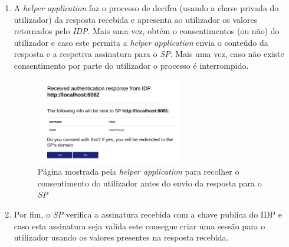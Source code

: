 \begin{enumerate}
    \item A \textit{helper application} faz o processo de decifra (usando a chave privada do utilizador) da resposta recebida e apresenta ao utilizador os valores retornados pelo \textit{IDP}. Mais uma vez, obtém o consentimentos (ou não) do utilizador e caso este permita a \textit{helper application} envia o conteúdo da resposta e a respetiva assinatura para o \textit{SP}. Mais uma vez, caso não existe consentimento por parte do utilizador o processo é interrompido.
    \begin{figure}[H]
        \caption{Página mostrada pela \textit{helper application} para recolher o consentimento do utilizador antes do envio da resposta para o \textit{SP}}
        \includegraphics[width=0.6\textwidth]{img/response_conset.png}
        \centering
    \end{figure}
    \item Por fim, o \textit{SP} verifica a assinatura recebida com a chave publica do IDP e caso esta assinatura seja valida este consegue criar uma sessão para o utilizador usando os valores presentes na resposta recebida.
\end{enumerate}
